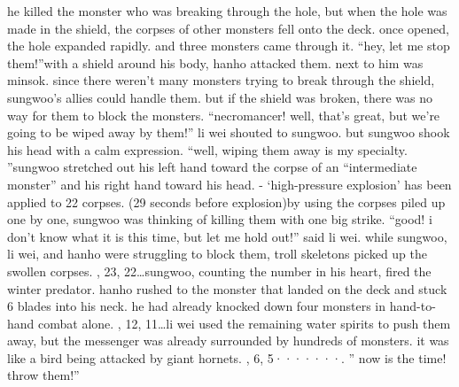 he killed the monster who was breaking through the hole, but when the hole was made in the shield, the corpses of other monsters fell onto the deck.
once opened, the hole expanded rapidly.
 and three monsters came through it.
“hey, let me stop them!”with a shield around his body, hanho attacked them.
 next to him was minsok.
since there weren’t many monsters trying to break through the shield, sungwoo’s allies could handle them.
 but if the shield was broken, there was no way for them to block the monsters.
“necromancer! well, that’s great, but we’re going to be wiped away by them!” li wei shouted to sungwoo.
but sungwoo shook his head with a calm expression.
“well, wiping them away is my specialty.
”sungwoo stretched out his left hand toward the corpse of an “intermediate monster” and his right hand toward his head.
- ‘high-pressure explosion’ has been applied to 22 corpses.
 (29 seconds before explosion)by using the corpses piled up one by one, sungwoo was thinking of killing them with one big strike.
“good! i don’t know what it is this time, but let me hold out!” said li wei.
while sungwoo, li wei, and hanho were struggling to block them, troll skeletons picked up the swollen corpses.
, 23, 22…sungwoo, counting the number in his heart, fired the winter predator.
 hanho rushed to the monster that landed on the deck and stuck 6 blades into his neck.
 he had already knocked down four monsters in hand-to-hand combat alone.
, 12, 11…li wei used the remaining water spirits to push them away, but the messenger was already surrounded by hundreds of monsters.
 it was like a bird being attacked by giant hornets.
, 6, 5·······.
” now is the time! throw them!”

 